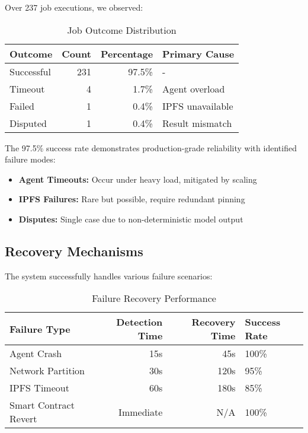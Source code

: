 Over 237 job executions, we observed:

\begin{table}[h]
\centering
\caption{Job Outcome Distribution}
\label{tab:outcomes}
\begin{tabular}{lrrl}
\toprule
\textbf{Outcome} & \textbf{Count} & \textbf{Percentage} & \textbf{Primary Cause} \\
\midrule
Successful & 231 & 97.5\% & - \\
Timeout & 4 & 1.7\% & Agent overload \\
Failed & 1 & 0.4\% & IPFS unavailable \\
Disputed & 1 & 0.4\% & Result mismatch \\
\bottomrule
\end{tabular}
\end{table}

The 97.5\% success rate demonstrates production-grade reliability with identified failure modes:
\begin{itemize}
    \item \textbf{Agent Timeouts:} Occur under heavy load, mitigated by scaling
    \item \textbf{IPFS Failures:} Rare but possible, require redundant pinning
    \item \textbf{Disputes:} Single case due to non-deterministic model output
\end{itemize}

\subsection{Recovery Mechanisms}

The system successfully handles various failure scenarios:

\begin{table}[h]
\centering
\caption{Failure Recovery Performance}
\label{tab:recovery}
\begin{tabular}{lrrl}
\toprule
\textbf{Failure Type} & \textbf{Detection Time} & \textbf{Recovery Time} & \textbf{Success Rate} \\
\midrule
Agent Crash & 15s & 45s & 100\% \\
Network Partition & 30s & 120s & 95\% \\
IPFS Timeout & 60s & 180s & 85\% \\
Smart Contract Revert & Immediate & N/A & 100\% \\
\bottomrule
\end{tabular}
\end{table}

